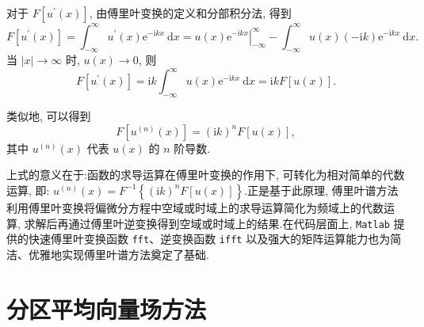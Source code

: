 对于 $F\left[u^{\prime}(x)\right]$, 由傅里叶变换的定义和分部积分法, 得到
\begin{equation}
    F\left[u^{\prime}(x)\right] = \int_{-\infty}^{\infty} u^{\prime}(x) \mathrm{e}^{-\mathrm{i} k x} \mathrm{~d} x = \left.u(x) \mathrm{e}^{-\mathrm{i} k x}\right|_{-\infty}^{\infty} - \int_{-\infty}^{\infty} u(x)(-\mathrm{i} k) \mathrm{e}^{-\mathrm{i} k x} \mathrm{~d} x. \label{eq:3-7}
\end{equation}
当 $\mid x\mid  \rightarrow \infty$ 时, $u(x) \rightarrow 0$, 则
\begin{equation}
    F\left[u^{\prime}(x)\right] = \mathrm{i} k \int_{-\infty}^{\infty} u(x) \mathrm{e}^{-\mathrm{i} k x} \mathrm{~d} x = \mathrm{i} k F[u(x)]. \label{eq:3-8}
\end{equation}

类似地, 可以得到
\begin{equation}
    F\left[u^{(n)}(x)\right] = (\mathrm{i} k)^n F[u(x)], \label{eq:3-9}
\end{equation}
其中 $u^{(n)}(x)$ 代表 $u(x)$ 的 $n$ 阶导数.

上式的意义在于:函数的求导运算在傅里叶变换的作用下, 可转化为相对简单的代数运算, 即: $u^{(n)}(x) = F^{-1}\left\{(\mathrm{i} k)^n F[u(x)]\right\}$.正是基于此原理, 傅里叶谱方法利用傅里叶变换将偏微分方程中空域或时域上的求导运算简化为频域上的代数运算, 求解后再通过傅里叶逆变换得到空域或时域上的结果.在代码层面上, \texttt{Matlab} 提供的快速傅里叶变换函数 \texttt{fft}、逆变换函数 \texttt{ifft} 以及强大的矩阵运算能力也为简洁、优雅地实现傅里叶谱方法奠定了基础.


\section{分区平均向量场方法}


